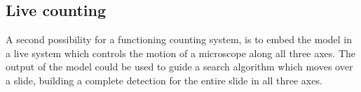 \subsection*{Live counting}
A second possibility for a functioning counting system, is to embed the model in a live system which controls the motion of a microscope along all three axes.
The output of the model could be used to guide a search algorithm which moves over a slide, building a complete detection for the entire slide in all three axes.
